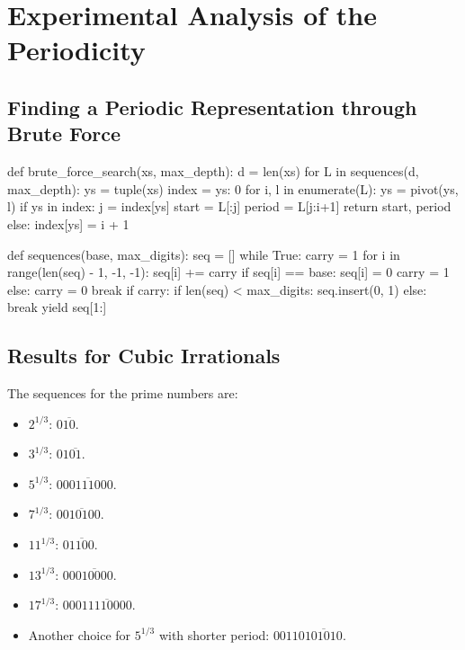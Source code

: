 \chapter{Experimental Analysis of the Periodicity}

\section{Finding a Periodic Representation through Brute Force}

\begin{minipage}{0.48\textwidth}
\begin{Python}[basicstyle=\small\ttfamily, frame={}]
def brute_force_search(xs, max_depth):
    d = len(xs)
    for L in sequences(d, max_depth):
        ys = tuple(xs)
        index = {ys: 0}
        for i, l in enumerate(L):
            ys = pivot(ys, l)
            if ys in index:
                j = index[ys]
                start = L[:j]
                period = L[j:i+1]
                return start, period
            else:
                index[ys] = i + 1
\end{Python}
\end{minipage}
\vrule width 1pt
\hfill
\begin{minipage}{0.48\textwidth}
\begin{Python}[basicstyle=\small\ttfamily, frame={}]
def sequences(base, max_digits):
    seq = []
    while True:
        carry = 1
        for i in range(len(seq) - 1, -1, -1):
            seq[i] += carry
            if seq[i] == base:
                seq[i] = 0
                carry = 1
            else:
                carry = 0
                break
        if carry:
            if len(seq) < max_digits:
                seq.insert(0, 1)
            else:
                break
        yield seq[1:]
\end{Python}
\end{minipage}

\section{Results for Cubic Irrationals}

\begin{example}
  The sequences for the prime numbers are:
  \begin{itemize}
    \item $2^{1/3}$: $0\overline{10}$.
    \item $3^{1/3}$: $01\overline{01}$.
    \item $5^{1/3}$: $0\overline{00111000}$.
    \item $7^{1/3}$: $0\overline{010100}$.
    \item $11^{1/3}$: $0\overline{1100}$.
    \item $13^{1/3}$: $00\overline{010000}$.
    \item $17^{1/3}$: $000\overline{11110000}$.
    \item Another choice for $5^{1/3}$ with shorter period: $00110\overline{101010}$.
  \end{itemize}
\end{example}

